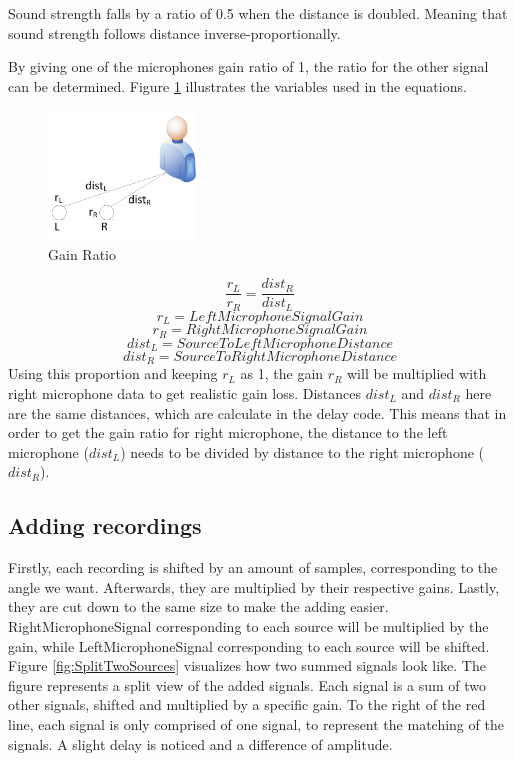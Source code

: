 Sound strength falls by a ratio of 0.5 when the distance is doubled. Meaning that 
sound strength follows distance inverse-proportionally.
 
By giving one of the microphones gain ratio of 1, the ratio for the other signal 
can be determined. Figure \ref{fig:ratioDependence} illustrates the variables used 
in the equations.

\begin{figure}[htp]
	\centering
	\includegraphics[width=0.35\textwidth]{Illustrations/gainRatio.jpg}
	\caption{Gain Ratio}
	\label{fig:ratioDependence}
\end{figure}

\begin{equation}
	\frac{r_L}{r_R} = \frac{dist_R}{dist_L}
\end{equation}
\begin{equation*}
	r_L = LeftMicrophoneSignalGain
\end{equation*}
\begin{equation*}
	r_R = RightMicrophoneSignalGain
\end{equation*}
\begin{equation*}
	dist_L = SourceToLeftMicrophoneDistance
\end{equation*}
\begin{equation*}
	dist_R = SourceToRightMicrophoneDistance
\end{equation*}
\newpage
Using this proportion and keeping \(r_L\) as 1, the gain \(r_R\) will be multiplied 
with right microphone data to get realistic gain loss. Distances \(dist_L\) and 
\(dist_R\) here are the same distances, which are calculate in the delay code. This 
means that in order to get the gain ratio for right microphone, the distance to the 
left microphone (\(dist_L\)) needs to be divided by distance to the right 
microphone (\(dist_R\)).

\subsection*{Adding recordings}
Firstly, each recording is shifted by an amount of samples, corresponding to the 
angle we want. Afterwards, they are multiplied by their respective gains. Lastly, 
they are cut down to the same size to make the adding easier. RightMicrophoneSignal 
corresponding to each source will be multiplied by the gain, while LeftMicrophoneSignal  
corresponding to each source will be shifted. Figure \ref{fig:SplitTwoSources} 
visualizes how two summed signals look like. The figure represents a split view of
the added signals. Each signal is a sum of two other signals, shifted and multiplied
by a specific gain. To the right of the red line, each signal is only comprised of
one signal, to represent the matching of the signals. A slight delay is noticed
and a difference of amplitude. 

